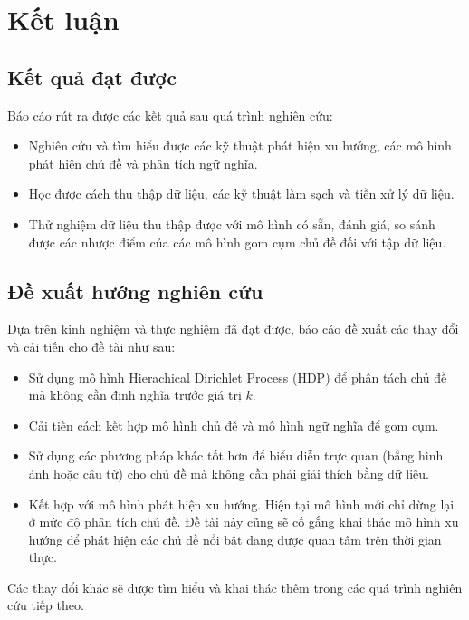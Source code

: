 \chapter{Kết luận}
\section{Kết quả đạt được}
Báo cáo rút ra được các kết quả sau quá trình nghiên cứu:
\begin{itemize}
    \item Nghiên cứu và tìm hiểu được các kỹ thuật phát hiện xu hướng, các mô
        hình phát hiện chủ đề và phân tích ngữ nghĩa.
    \item Học được cách thu thập dữ liệu, các kỹ thuật làm sạch và tiền xử lý
        dữ liệu.
    \item Thử nghiệm dữ liệu thu thập được với mô hình có sẵn, đánh giá, so
        sánh được các nhược điểm của các mô hình gom cụm chủ đề đối với tập dữ
        liệu.
\end{itemize}

\section{Đề xuất hướng nghiên cứu}
Dựa trên kinh nghiệm và thực nghiệm đã đạt được, báo cáo đề xuất các thay đổi và cải tiến cho đề tài như sau:

\begin{itemize}
    \item Sử dụng mô hình Hierachical Dirichlet Process (HDP) để phân tách chủ
        đề mà không cần định nghĩa trước giá trị $k$.
    \item Cải tiến cách kết hợp mô hình chủ đề và mô hình ngữ nghĩa để gom cụm.
    \item Sử dụng các phương pháp khác tốt hơn để biểu diễn trực quan (bằng
        hình ảnh hoặc câu từ) cho chủ đề mà không cần phải giải thích bằng dữ
        liệu.
    \item Kết hợp với mô hình phát hiện xu hướng. Hiện tại mô hình mới chỉ dừng
        lại ở mức độ phân tích chủ đề. Đề tài này cũng sẽ cố gắng khai thác mô
        hình xu hướng để phát hiện các chủ đề nổi bật đang được quan tâm trên
        thời gian thực.
\end{itemize}

Các thay đổi khác sẽ được tìm hiểu và khai thác thêm trong các quá trình nghiên
cứu tiếp theo.
